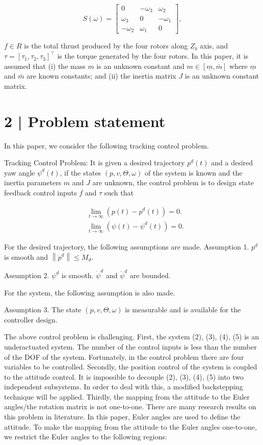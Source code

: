 \documentclass[10pt]{article}
\begin{document}
$$
S(\omega)=\left[\begin{array}{ccc}
0 & -\omega_{3} & \omega_{2} \\
\omega_{3} & 0 & -\omega_{1} \\
-\omega_{2} & \omega_{1} & 0
\end{array}\right],
$$

$f \in R$ is the total thrust produced by the four rotors along $Z_{b}$ axis, and $\tau=\left[\tau_{1}, \tau_{2}, \tau_{3}\right]^{\top}$ is the torque generated by the four rotors. In this paper, it is assumed that (i) the mass $m$ is an unknown constant and $m \in[\underline{m}, \bar{m}]$ where $\underline{m}$ and $\bar{m}$ are known constants; and (ii) the inertia matrix $J$ is an unknown constant matrix.

\section{2 | Problem statement}
In this paper, we consider the following tracking control problem.

Tracking Control Problem: It is given a desired trajectory $p^{d}(t)$ and a desired yaw angle $\psi^{d}(t)$, if the states $(p, v, \Theta, \omega)$ of the system is known and the inertia parameters $m$ and $J$ are unknown, the control problem is to design state feedback control inputs $f$ and $\tau$ such that

$$
\begin{aligned}
& \lim _{t \rightarrow \infty}\left(p(t)-p^{d}(t)\right)=0 . \\
& \lim _{t \rightarrow \infty}\left(\psi(t)-\psi^{d}(t)\right)=0 .
\end{aligned}
$$

For the desired trajectory, the following assumptions are made. Assumption 1. $p^{d}$ is smooth and $\left\|\ddot{p}^{d}\right\| \leq M_{d}$.

Assumption 2. $\psi^{d}$ is smooth. $\dot{\psi}^{d}$ and $\ddot{\psi}^{d}$ are bounded.

For the system, the following assumption is also made.

Assumption 3. The state $(p, v, \Theta, \omega)$ is measurable and is available for the controller design.

The above control problem is challenging. First, the system (2), (3), (4), (5) is an underactuated system. The number of the control inputs is less than the number of the DOF of the system. Fortunately, in the control problem there are four variables to be controlled. Secondly, the position control of the system is coupled to the attitude control. It is impossible to decouple (2), (3), (4), (5) into two independent subsystems. In order to deal with this, a modified backstepping technique will be applied. Thirdly, the mapping from the attitude to the Euler angles/the rotation matrix is not one-to-one. There are many research results on this problem in literature. In this paper, Euler angles are used to define the attitude. To make the mapping from the attitude to the Euler angles one-to-one, we restrict the Euler angles to the following regions:
\end{document}
